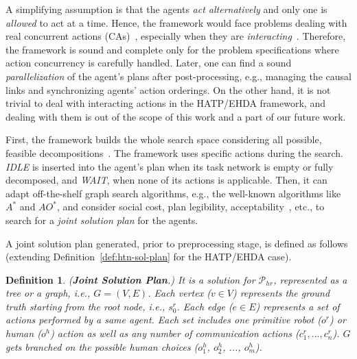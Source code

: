 \documentclass[letterpaper]{article} %
\newtheorem{definition}{Definition}
\begin{document}
A simplifying assumption is that the agents \textit{act alternatively} and only one is \textit{allowed} to act at a time.
Hence, the framework would face problems dealing with real concurrent actions (CAs)~\cite{CrosbyJR14}, especially when they are \textit{interacting}~\cite{ShekharB20}. 
Therefore, the framework is sound and complete only for   the problem specifications where action concurrency is carefully handled. Later, one can find a sound \textit{parallelization} of the agent's plans after post-processing, e.g., managing the causal links and synchronizing agents' action orderings. 
On the other hand, it is not trivial to deal with interacting actions in the HATP/EHDA framework, and dealing with them is out of the scope of this work and a part of our future work.  

First, the framework builds the whole search space considering all possible, feasible decompositions~\cite{buisan:hal-03684211}. 
The framework uses specific actions during the search.
{\em IDLE} is inserted into the agent's plan when its task network is empty or fully decomposed, and {\em WAIT}, when none of its actions is applicable.
Then, it can adapt off-the-shelf graph search algorithms, e.g., the well-known algorithms like $A^*$ and $AO^*$, and consider social cost, plan legibility, acceptability~\cite{alili2009task}, etc., to search for a \textit{joint solution plan} for the agents. 

A joint solution plan generated, prior to preprocessing stage, is defined as follows (extending Definition~\ref{def:htn-sol-plan} for the HATP/EHDA case). 
\begin{definition}
(\textbf{Joint Solution Plan}.) 
{It is a solution for $\mathcal{P}_{hr}$, represented as a tree or a graph, i.e., $G=(V,E)$. Each vertex ($v \in V$) represents the ground truth starting from the root node,  i.e., $s_0^r$. 
Each edge ($e \in E$) represents a set of actions performed by a same agent. Each set includes one primitive robot ($o^{r}$) or human ($o^{h}$) action as well as any number of communication actions ($c^r_1,...,c^r_n$). $G$ gets branched on the possible human choices ($o^{h}_1$, $o^{h}_2$, ..., $o^{h}_m$). 
}  
\end{definition}
\end{document}
